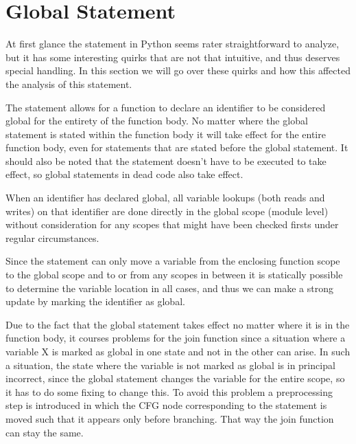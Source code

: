 \chapter{Global Statement}
At first glance the  statement in Python seems rater straightforward to analyze, but it has some interesting quirks that are not that intuitive, and thus deserves special handling. In this section we will go over these quirks and how this affected the analysis of this statement.

The statement allows for a function to declare an identifier to be considered global for the entirety of the function body. No matter where the global statement is stated within the function body it will take effect for the entire function body, even for statements that are stated before the global statement. It should also be noted that the statement doesn't have to be executed to take effect, so global statements in dead code also take effect.

When an identifier has declared global, all variable lookups (both reads and writes) on that identifier are done directly in the global scope (module level) without consideration for any scopes that might have been checked firsts under regular circumstances.

Since the  statement can only move a variable from the enclosing function scope to the global scope and to or from any scopes in between it is statically possible to determine the variable location in all cases, and thus we can make a strong update by marking the identifier as global. 

Due to the fact that the global statement takes effect no matter where it is in the function body, it courses problems for the join function since a situation where a variable X is marked as global in one state and not in the other can arise. In such a situation, the state where the variable is not marked as global is in principal incorrect, since the global statement changes the variable for the entire scope, so it has to do some fixing to change this. To avoid this problem a preprocessing step is introduced in which the CFG node corresponding to the  statement is moved such that it appears only before branching. That way the join function can stay the same.
